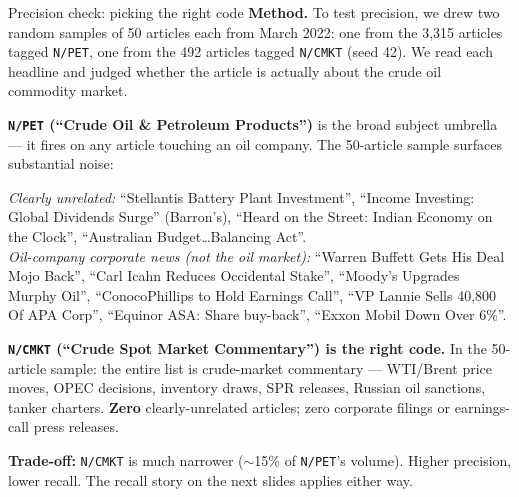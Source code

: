 \documentclass[10pt,aspectratio=169]{beamer}
\begin{document}
\begin{frame}{Precision check: picking the right code}
  \scriptsize
  \textbf{Method.} To test precision, we drew two random samples of 50
  articles each from March 2022: one from the 3,315 articles tagged
  \texttt{N/PET}, one from the 492 articles tagged \texttt{N/CMKT}
  (seed 42). We read each headline and judged whether the article is
  actually about the crude oil commodity market.

  \smallskip
  \textbf{\texttt{N/PET} (``Crude Oil \& Petroleum Products'')} is the broad
  subject umbrella --- it fires on any article touching an oil company.
  The 50-article sample surfaces substantial noise:

  \smallskip
  \textit{Clearly unrelated:} ``Stellantis Battery Plant Investment'',
  ``Income Investing: Global Dividends Surge'' (Barron's),
  ``Heard on the Street: Indian Economy on the Clock'',
  ``Australian Budget\ldots{}Balancing Act''. \\
  \textit{Oil-company corporate news (not the oil market):}
  ``Warren Buffett Gets His Deal Mojo Back'',
  ``Carl Icahn Reduces Occidental Stake'',
  ``Moody's Upgrades Murphy Oil'',
  ``ConocoPhillips to Hold Earnings Call'',
  ``VP Lannie Sells 40,800 Of APA Corp'',
  ``Equinor ASA: Share buy-back'',
  ``Exxon Mobil Down Over 6\%''.

  \smallskip
  \textbf{\texttt{N/CMKT} (``Crude Spot Market Commentary'') is the right code.}
  In the 50-article sample: the entire list is crude-market commentary ---
  WTI/Brent price moves, OPEC decisions, inventory draws, SPR releases,
  Russian oil sanctions, tanker charters. \textbf{Zero} clearly-unrelated
  articles; zero corporate filings or earnings-call press releases.

  \smallskip
  \textbf{Trade-off:} \texttt{N/CMKT} is much narrower ($\sim$15\% of
  \texttt{N/PET}'s volume). Higher precision, lower recall. The recall
  story on the next slides applies either way.

\end{frame}
\end{document}
